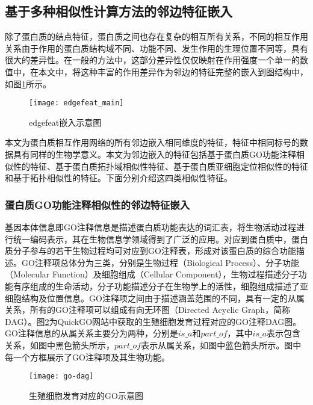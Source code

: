 \subsection{基于多种相似性计算方法的邻边特征嵌入}
\label{subsection:featPPINetwork:edgeFeatConstruct}

除了蛋白质的结点特征，蛋白质之间也存在复杂的相互所有关系，不同的相互作用关系由于作用的蛋白质结构域不同、功能不同、发生作用的生理位置不同等，具有很大的差异性。在一般的方法中，这部分差异性仅仅映射在作用强度一个单一的数值中，在本文中，将这种丰富的作用差异作为邻边的特征完整的嵌入到图结构中，如图\ref{fig:edgefeat_main}所示。


\begin{figure}[htbp]
    \centering
    \texttt{[image: edgefeat\_main]}
    \caption{edgefeat嵌入示意图}
    \label{fig:edgefeat_main}
\end{figure}
本文为蛋白质相互作用网络的所有邻边嵌入相同维度的特征，特征中相同标号的数据具有同样的生物学意义。本文为邻边嵌入的特征包括基于蛋白质GO功能注释相似性的特征、基于蛋白质拓扑域相似性特征、基于蛋白质亚细胞定位相似性的特征和基于拓扑相似性的特征。下面分别介绍这四类相似性特征。

\subsubsection{蛋白质GO功能注释相似性的邻边特征嵌入}

基因本体信息\cite{ashburner_gene_2000}即GO注释信息是描述蛋白质功能表达的词汇表，将生物活动过程进行统一编码表示，其在生物信息学领域得到了广泛的应用。对应到蛋白质中，蛋白质分子参与的若干生物过程均可对应到GO注释表，形成对该蛋白质的综合功能描述。GO注释项总体分为三类，分别是生物过程（Biological Process）、分子功能（Molecular Function）及细胞组成（Cellular Component），生物过程描述分子功能有序组成的生命活动，分子功能描述分子在生物学上的活性，细胞组成描述了亚细胞结构及位置信息。GO注释项之间由于描述涵盖范围的不同，具有一定的从属关系，所有的GO注释项可以组成有向无环图（Directed Acyclic Graph，简称DAG）。图\ref{fig:go-dag}为QuickGO\cite{binns_quickgo_2009}网站中获取的生殖细胞发育过程对应的GO注释DAG图。GO注释信息的从属关系主要分为两种，分别是$is\_a$和$part\_of$，其中$is\_a$表示包含关系，如图中黑色箭头所示，$part\_of$表示从属关系，如图中蓝色箭头所示。图中每一个方框展示了GO注释项及其生物功能。
\begin{figure}[htbp]
    \centering
    \texttt{[image: go-dag]}
    \caption{生殖细胞发育对应的GO示意图\cite{binns_quickgo_2009}}
    \label{fig:go-dag}
\end{figure}

